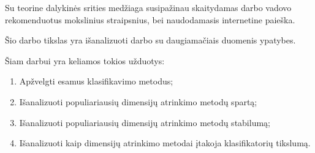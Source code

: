 Su teorine dalykinės srities medžiaga susipažinau skaitydamas darbo vadovo 
rekomenduotus mokslinius straipsnius, bei naudodamasis internetine paieška.

Šio darbo tikslas yra išanalizuoti darbo su daugiamačiais duomenis ypatybes.

Šiam darbui yra keliamos tokios užduotys:
\begin{enumerate}
 \item Apžvelgti esamus klasifikavimo metodus;
 \item Išanalizuoti populiariausių dimensijų atrinkimo metodų spartą;
 \item Išanalizuoti populiariausių dimensijų atrinkimo metodų stabilumą;
 \item Išanalizuoti kaip dimensijų atrinkimo metodai įtakoja klasifikatorių tikslumą.
\end{enumerate}

